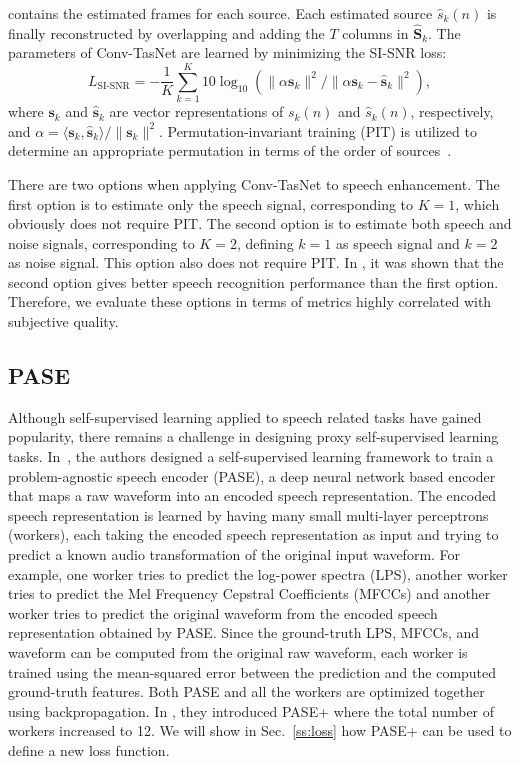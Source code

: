 \documentclass[a4paper]{article}
\begin{document}
\begin{spacing}{0.9}
contains the estimated frames for each source.
Each estimated source $\hat{s}_k(n)$ is finally reconstructed by overlapping and adding the $T$ columns in $\hat{\mathbf{S}}_k$.
The parameters of Conv-TasNet are learned by minimizing the SI-SNR loss:
\begin{equation}
L_{\text{SI-SNR}} = -\frac{1}{K}\sum_{k=1}^K 10\log_{10}(\|\alpha\mathbf{s}_k\|^2/\|\alpha\mathbf{s}_k-\hat{\mathbf{s}}_k\|^2),
\label{eq:sisnrloss}
\end{equation}
where  $\mathbf{s}_k$ and $\hat{\mathbf{s}}_k$
are vector representations of $s_k(n)$ and $\hat{s}_k(n)$, respectively, and $\alpha = \langle \mathbf{s}_k,\hat{\mathbf{s}}_k \rangle/\|\mathbf{s}_k\|^2$.
Permutation-invariant training (PIT) is utilized to determine an appropriate permutation in terms of the order of sources~\cite{kolbaek2017multitalker}.

There are two options when applying Conv-TasNet to speech enhancement.
The first option is to estimate only the speech signal, corresponding to $K=1$, which obviously does not require PIT.
The second option is to estimate both speech and noise signals, corresponding to $K=2$, defining $k=1$ as speech signal and $k=2$ as noise signal. 
This option also does not require PIT.
In \cite{kinoshita2020improving}, it was shown that the second option gives better speech recognition performance than the first option.
Therefore, we evaluate these options in terms of metrics highly correlated with subjective quality.

\subsection{PASE}
\label{ss:pase}
Although self-supervised learning applied to speech related tasks have gained popularity, there remains a challenge in designing proxy self-supervised learning tasks.  In~\cite{Pascual2019,ravanelli2020multi}, the authors designed a self-supervised learning framework to train a problem-agnostic speech encoder (PASE), a deep neural network based encoder that maps a raw waveform into an encoded speech representation.  The encoded speech representation is learned by having many small multi-layer perceptrons (workers), each taking the encoded speech representation as input and trying to predict a known audio transformation of the original input waveform.  For example, one worker tries to predict the log-power spectra (LPS), another worker tries to predict the Mel Frequency Cepstral Coefficients (MFCCs) and another worker tries to predict the original waveform from the encoded speech representation obtained by PASE.  Since the ground-truth LPS, MFCCs, and waveform can be computed from the original raw waveform, each worker is trained using the mean-squared error between the prediction and the computed ground-truth features.  Both PASE and all the workers are optimized together using backpropagation.  
In \cite{ravanelli2020multi}, they introduced PASE+ where the total number of workers increased to 12. 
We will show in Sec.~\ref{ss:loss} how PASE+ can be used to define a new loss function.


\end{spacing}
\end{document}
